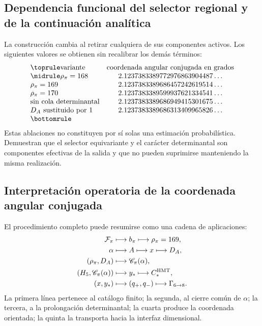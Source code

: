 \subsection{Dependencia funcional del selector regional y de la continuación analítica}
\label{sec:s102:c38:7:2}


La construcción cambia al retirar cualquiera de sus componentes activos.
Los siguientes valores se obtienen sin recalibrar los demás términos:
\[
\begin{array}{@{}lc@{}}
\toprule
\text{variante}&\text{coordenada angular conjugada en grados}\\
\midrule
\rho_\pi=168&2.1237383389772976863904487\ldots\\
\rho_\pi=169&2.1237383389686457242619514\ldots\\
\rho_\pi=170&2.1237383389599937621334541\ldots\\
\text{sin cola determinantal}&2.1237383389686949415301675\ldots\\
D_A\text{ sustituido por }1&2.1237383389686313409965826\ldots\\
\bottomrule
\end{array}
\]
Estas ablaciones no constituyen por sí solas una estimación probabilística.
Demuestran que el selector equivariante y el carácter determinantal son
componentes efectivas de la salida y que no pueden suprimirse manteniendo la
misma realización.

\subsection{Interpretación operatoria de la coordenada angular conjugada}
\label{sec:s102:c38:7:3}


El procedimiento completo puede resumirse como una cadena de aplicaciones:
\[
\begin{aligned}
\mathcal F_\pi
&\longmapsto b_\pi
\longmapsto\rho_\pi=169,\\
\alpha
&\longmapsto A
\longmapsto x
\longmapsto D_A,\\
(\rho_\pi,D_A)
&\longmapsto\mathscr C_\pi(\alpha),\\
(H_5,\mathscr C_\pi(\alpha))
&\longmapsto y_*
\longmapsto C_*^{\rm HMT},\\
(x,y_*)
&\longmapsto(q_+,q_-)
\longmapsto\Gamma_{6\to8}.
\end{aligned}
\]
La primera línea pertenece al catálogo finito; la segunda, al cierre común de
\(\alpha\); la tercera, a la prolongación determinantal; la cuarta produce la
coordenada orientada; la quinta la transporta hacia la interfaz dimensional.

